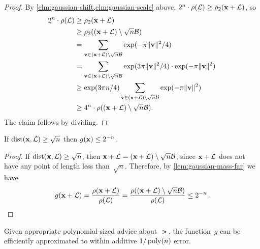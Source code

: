 \documentclass[11pt]{article}
\begin{document}
\begin{proof}
  By \cref{clm:gaussian-shift,clm:gaussian-scale} above,
  $2^n \cdot \rho(\mathcal{L}) \geq \rho_2(\mathbf{x} + \mathcal{L})$, so
  \begin{align*}
    2^n \cdot \rho(\mathcal{L})
    &\geq \rho_2(\mathbf{x} + \mathcal{L}) \\
    &\geq \rho_2((\mathbf{x} + \mathcal{L})\setminus \sqrt{n}\mathcal{B}) \\
    &= \sum_{\mathbf{v} \in (\mathbf{x} + \mathcal{L}) \setminus \sqrt{n}\mathcal{B}} \exp(-\pi \lVert\mathbf{v}\rVert^2/4) \\
    &= \sum_{\mathbf{v} \in (\mathbf{x} + \mathcal{L}) \setminus \sqrt{n}\mathcal{B}}
      \exp(3\pi \lVert\mathbf{v}\rVert^2/4) \cdot \exp(-\pi \lVert\mathbf{v}\rVert^2) \\
    &\geq \exp(3\pi n/4) \sum_{\mathbf{v} \in (\mathbf{x} + \mathcal{L}) \setminus
      \sqrt{n}\mathcal{B}}\exp(-\pi \lVert\mathbf{v}\rVert^2) \\
    &\geq  4^n \cdot \rho((\mathbf{x} + \mathcal{L})\setminus \sqrt{n}\mathcal{B}).
  \end{align*}
  The claim follows by dividing.
\end{proof}

\begin{corollary}
  If $\operatorname{dist}(\mathbf{x},\mathcal{L}) \geq \sqrt{n}$ then $g(\mathbf{x}) \leq 2^{-n}$.
\end{corollary}

\begin{proof}
  If $\operatorname{dist}(\mathbf{x},\mathcal{L}) \geq \sqrt{n}$, then
  $\mathbf{x} + \mathcal{L} = (\mathbf{x} + \mathcal{L}) \setminus \sqrt{n}\mathcal{B}$, since
  $\mathbf{x} + \mathcal{L}$ does not have any point of length less
  than~$\sqrt{n}$. Therefore, by \cref{lem:gaussian-mass-far} we have
  \[ g(\mathbf{x} + \mathcal{L}) = \frac{\rho(\mathbf{x} + \mathcal{L})}{\rho(\mathcal{L})} =
    \frac{\rho((\mathbf{x} + \mathcal{L})\setminus \sqrt{n}\mathcal{B})}{\rho(\mathcal{L})}
    \leq 2^{-n} . \]
\end{proof}

\begin{lemma}
  Given appropriate polynomial-sized advice about~$\lat$, the
  function~$g$ can be efficiently approximated to within additive
  $1/\operatorname{poly}(n)$ error.
\end{lemma}
\end{document}
